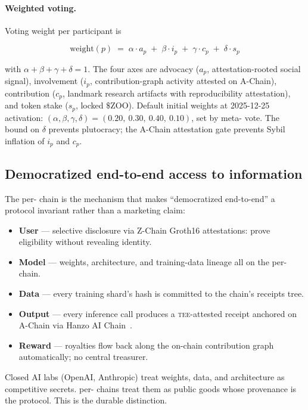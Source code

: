 \paragraph{Weighted voting.}
Voting weight per participant is

\[
\text{weight}(p) \;=\; \alpha \cdot a_p \;+\; \beta \cdot i_p \;+\; \gamma \cdot c_p \;+\; \delta \cdot s_p
\]

\noindent with $\alpha + \beta + \gamma + \delta = 1$. The four axes
are advocacy ($a_p$, attestation-rooted social signal), involvement
($i_p$, contribution-graph activity attested on A-Chain), contribution
($c_p$, landmark research artifacts with reproducibility attestation),
and token stake ($s_p$, locked $\$$ZOO). Default initial weights at
2025-12-25 activation:
$(\alpha, \beta, \gamma, \delta) = (0.20,\ 0.30,\ 0.40,\ 0.10)$, set
by meta-\DAO{} vote. The bound on $\delta$ prevents plutocracy; the
A-Chain attestation gate prevents Sybil inflation of $i_p$ and $c_p$.

\subsection{Democratized end-to-end access to information}
\label{sec:democratized}

The per-\LLM{} chain is the mechanism that makes ``democratized
end-to-end'' a protocol invariant rather than a marketing claim:

\begin{itemize}[nosep,leftmargin=1.2em]
\item \textbf{User} --- selective disclosure via Z-Chain Groth16
   attestations: prove eligibility without revealing identity.
\item \textbf{Model} --- weights, architecture, and training-data
   lineage all on the per-\LLM{} chain.
\item \textbf{Data} --- every training shard's hash is committed to
   the chain's receipts tree.
\item \textbf{Output} --- every inference call produces a
   \textsc{tee}-attested receipt anchored on A-Chain via Hanzo AI
   Chain~\cite{hanzo-ai-chain}.
\item \textbf{Reward} --- royalties flow back along the on-chain
   contribution graph automatically; no central treasurer.
\end{itemize}

Closed AI labs (OpenAI, Anthropic) treat weights, data, and
architecture as competitive secrets. \Zoo{} per-\LLM{} chains treat
them as public goods whose provenance is the protocol. This is the
durable distinction.

